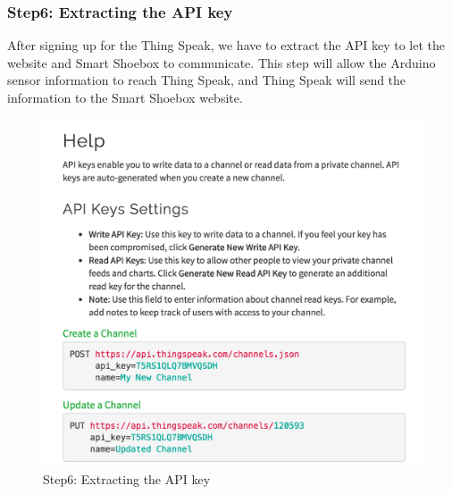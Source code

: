 \documentclass[conference]{IEEEtran}
\begin{document}
\subsubsection{Step6: Extracting the API key}
After signing up for the Thing Speak, we have to extract the API key to let the website and Smart Shoebox to communicate. This step will allow the Arduino sensor information to reach Thing Speak, and Thing Speak will send the information to the Smart Shoebox website.
\begin{figure}[H]
\begin{center}
    \includegraphics[scale=0.4]{step6}
    \caption{Step6: Extracting the API key} \label{fig:label}
\end{center}
\end{figure}
\end{document}
